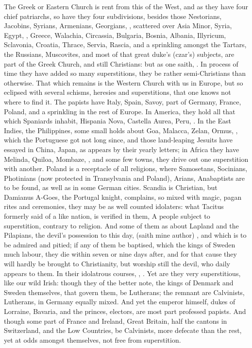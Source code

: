 {The Greek or Eastern Church is rent from this of the West, and as
they have four chief patriarchs, so have they four subdivisions,
besides those Nestorians, Jacobins, Syrians, Armenians, Georgians, \etc{},
scattered over Asia Minor, Syria, Egypt, \etc{}, Greece, Walachia,
Circassia, Bulgaria, Bosnia, Albania, Illyricum, Sclavonia, Croatia,
Thrace, Servia, Rascia, and a sprinkling amongst the Tartars, the
Russians, Muscovites, and most of that great duke's (czar's) subjects,
are part of the Greek Church, and still Christians: but as one
saith, . In
process of time they have added so many superstitions, they be rather
semi-Christians than otherwise. That which remains is the Western
Church with us in Europe, but so eclipsed with several schisms,
heresies and superstitions, that one knows not where to find it. The
papists have Italy, Spain, Savoy, part of Germany, France, Poland, and
a sprinkling in the rest of Europe. In America, they hold all that
which Spaniards inhabit, Hispania Nova, Castella Aurea, Peru, \etc{}. In
the East Indies, the Philippines, some small holds about Goa, Malacca,
Zelan, Ormus, \etc{}, which the Portuguese got not long since, and those
land-leaping Jesuits have essayed in China, Japan, as appears by their
yearly letters; in Africa they have Melinda, Quiloa, Mombaze, \etc{}, and
some few towns, they drive out one superstition with another. Poland is
a receptacle of all religions, where Samosetans, Socinians, Photinians
(now protected in Transylvania and Poland), Arians, Anabaptists are to
be found, as well as in some German cities. Scandia is Christian, but
Damianus A-Goes, the Portugal knight, complains, so mixed with
magic, pagan rites and ceremonies, they may be as well counted
idolaters: what Tacitus formerly said of a like nation, is verified in
them, A people subject to superstition, contrary to religion. And
some of them as about Lapland and the Pilapians, the devil's possession
to this day,  (saith mine author) , and which is
to be admired and pitied; if any of them be baptised, which the kings
of Sweden much labour, they die within seven or nine days after, and
for that cause they will hardly be brought to Christianity, but worship
still the devil, who daily appears to them. In their idolatrous
courses, , \etc{}. Yet are
they very superstitious, like our wild Irish: though they of the better
note, the kings of Denmark and Sweden themselves, that govern them, be
Lutherans; the remnant are Calvinists, Lutherans, in Germany equally
mixed. And yet the emperor himself, dukes of Lorraine, Bavaria, and the
princes, electors, are most part professed papists. And though some
part of France and Ireland, Great Britain, half the cantons in
Switzerland, and the Low Countries, be Calvinists, more defecate than
the rest, yet at odds amongst themselves, not free from superstition.

}
